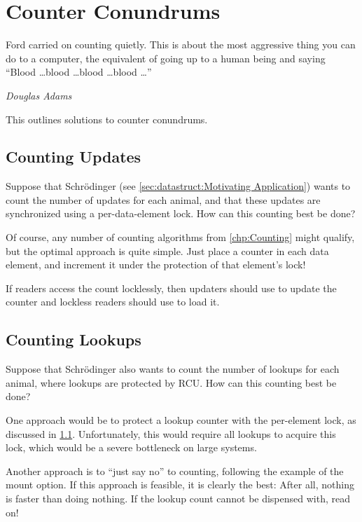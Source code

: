
\section{Counter Conundrums}
\label{sec:together:Counter Conundrums}
%
\epigraph{Ford carried on counting quietly.
	  This is about the most aggressive thing you can do to a
	  computer, the equivalent of going up to a human being and saying
	  ``Blood \dots blood \dots blood \dots blood \dots''}
	 {\emph{Douglas Adams}}

This 
outlines solutions to counter conundrums.

\subsection{Counting Updates}
\label{sec:together:Counting Updates}

Suppose that Schr\"odinger (see
\cref{sec:datastruct:Motivating Application})
wants to count the number of updates for each animal,
and that these updates are synchronized using a per-data-element lock.
How can this counting best be done?

Of course, any number of counting algorithms from \cref{chp:Counting}
might qualify, but the optimal approach is quite simple.
Just place a counter in each data element, and increment it under the
protection of that element's lock!

If readers access the count locklessly, then updaters should use
 to update the counter and lockless readers should
use  to load it.

\subsection{Counting Lookups}
\label{sec:together:Counting Lookups}

Suppose that Schr\"odinger also wants to count the number of lookups for
each animal, where lookups are protected by RCU\@.
How can this counting best be done?

One approach would be to protect a lookup counter with the per-element
lock, as discussed in \cref{sec:together:Counting Updates}.
Unfortunately, this would require all lookups to acquire this lock,
which would be a severe bottleneck on large systems.

Another approach is to ``just say no'' to counting, following the example
of the  mount option.
If this approach is feasible, it is clearly the best:  After all, nothing
is faster than doing nothing.
If the lookup count cannot be dispensed with, read on!

